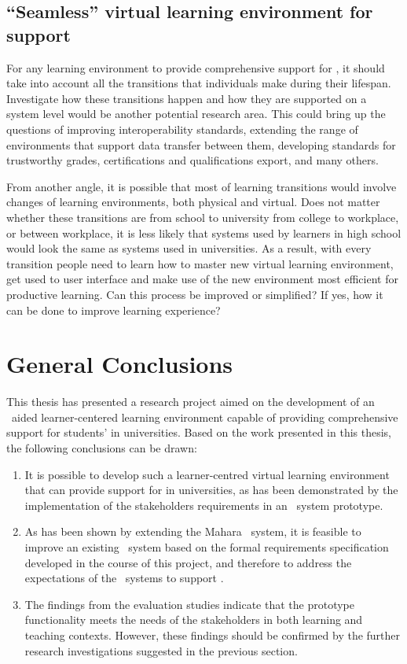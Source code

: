 \subsection{``Seamless'' virtual learning environment for \LLLs support} 
For any learning environment to provide comprehensive support for \LLLs, it
should take into account all the transitions that individuals make during their
lifespan. Investigate how these transitions happen and how they are supported on
a system level would be another potential research area. This could bring up the
questions of improving interoperability standards, extending the range of
environments that support data transfer between them, developing standards for
trustworthy grades, certifications and qualifications export, and many others.

From another angle, it is possible that most of learning transitions would
involve changes of learning environments, both physical and virtual. Does not
matter whether these transitions are from school to university from college to
workplace, or between workplace, it is less likely that systems used by learners
in high school would look the same as systems used in universities. As a result,
with every transition people need to learn how to master new virtual learning
environment, get used to user interface and make use of the new environment most
efficient for productive learning. Can this process be improved or simplified?
If yes, how it can be done to improve learning experience?

\section{General Conclusions}

This thesis has presented a research project aimed on the development of an
\ep~aided learner-centered learning environment capable of providing
comprehensive support for students' \LLLs in universities. Based on the work
presented in this thesis, the following conclusions can be drawn:
\begin{enumerate}
  \item It is possible to develop such a learner-centred virtual learning
  environment that can provide support for \LLLs in universities, as has been
  demonstrated by the implementation of the stakeholders requirements in an
  \ep~system prototype.
  \item As has been shown by extending the Mahara \ep~system, it is feasible to
  improve an existing \ep~system based on the formal requirements specification
  developed in the course of this project, and therefore to address the
  expectations of the \ep~systems to support \LLLsn.
  \item The findings from the evaluation studies indicate that the prototype
  functionality meets the needs of the stakeholders in both learning and
  teaching contexts. However, these findings should be confirmed by the further
  research investigations suggested in the previous section.
\end{enumerate}

